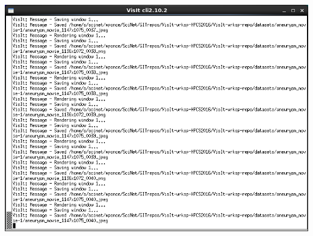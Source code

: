 \begin{frame}
\begin{columns}
\begin{column}{5cm}
	\includegraphics[width=\columnwidth]{figs/visit-guis/visit_movieCLI}
\end{column}
\end{columns}
\end{frame}


\normalEnv

